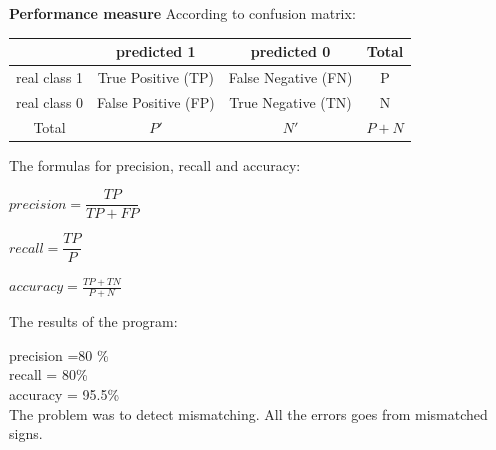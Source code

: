 \documentclass[12pt]{article}
\begin{document}
	\medskip
	
	\textbf{Performance measure}
	According to confusion matrix:
	
	\begin{tabular}{|c||c|c|c|}
		\hline
		\ & predicted 1 & predicted 0 & Total \\
		\hline
		real class 1 & True Positive (TP) & False Negative (FN) & P\\
		\hline
		real class 0 & False Positive (FP) & True Negative (TN) & N \\
		\hline
		Total & $P'$ & $N'$ & $P+N$\\
		\hline 
	\end{tabular}
	\medskip
	
	The formulas for precision, recall and accuracy:
	\begin{list}{)~}{}
		\item $precision = \dfrac{TP}{TP+FP}$
		\item $recall = \dfrac{TP}{P}$
		\item $accuracy = \frac{TP+TN}{P+N}$
	\end{list}
	
	The results of the program:

	precision =80 \%\\ 
	recall = 80\%\\
	accuracy = 95.5\%\\
	
	The problem was to detect mismatching. All the errors goes from mismatched signs.
	
\end{document}
